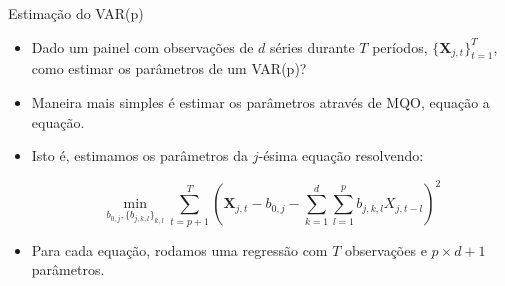\documentclass[11pt]{beamer}
\begin{document}
\begin{frame}{Estimação do VAR(p)}
	\begin{itemize}
		\item 	Dado um painel com observações de $d$ séries durante $T$ períodos, $\{\boldsymbol{X}_{j,t}\}_{t=1}^T$, como estimar os parâmetros de um VAR(p)?
		\item Maneira mais simples é estimar os parâmetros através de MQO, {\color{blue}equação a equação}.
		\item Isto é, estimamos os parâmetros da $j$-ésima equação resolvendo:
		
		$$\min_{b_{0,j}, \{b_{j,k,l}\}_{k,l}} \sum_{t=p+1}^T\left(\boldsymbol{X}_{j,t} - b_{0,j} - \sum_{k=1}^d \sum_{l=1}^p b_{j,k,l}X_{j,t-l}\right)^2$$
		\item Para cada equação, rodamos uma regressão com $T$ observações e $p\times d +1$ parâmetros.
	\end{itemize}

\end{frame}
\end{document}
